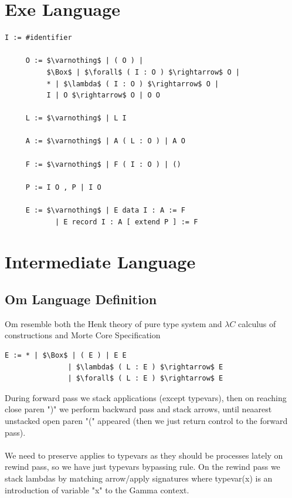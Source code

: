 \documentclass[11pt,oneside]{article}
\begin{document}
\newpage

  \section{Exe Language}

\begin{lstlisting}[mathescape=true]
 I := #identifier

     O := $\varnothing$ | ( O ) |
          $\Box$ | $\forall$ ( I : O ) $\rightarrow$ O |
          * | $\lambda$ ( I : O ) $\rightarrow$ O |
          I | O $\rightarrow$ O | O O

     L := $\varnothing$ | L I
    
     A := $\varnothing$ | A ( L : O ) | A O

     F := $\varnothing$ | F ( I : O ) | ()
     
     P := I O , P | I O

     E := $\varnothing$ | E data I : A := F
            | E record I : A [ extend P ] := F
\end{lstlisting}

\newpage

  \section{Intermediate Language}
\vspace{1cm}

   \subsection{Om Language Definition}
\vspace{0.5cm}
   Om resemble both the Henk theory of pure type system and $\lambda C$ calculus of constructions
   and Morte Core Specification

\begin{lstlisting}[mathescape=true]
    E := * | $\Box$ | ( E ) | E E 
               | $\lambda$ ( L : E ) $\rightarrow$ E 
               | $\forall$ ( L : E ) $\rightarrow$ E
\end{lstlisting}

During forward pass we stack applications (except typevars), then
on reaching close paren ")" we perform backward pass and stack arrows,
until neaarest unstacked open paren "(" appeared (then we just return
control to the forward pass).

\paragraph{}
We need to preserve applies to typevars as they should
be processes lately on rewind pass, so we have just typevars bypassing rule.
On the rewind pass we stack lambdas by matching arrow/apply signatures
where typevar(x) is an introduction of variable "x" to the Gamma context.
\end{document}
